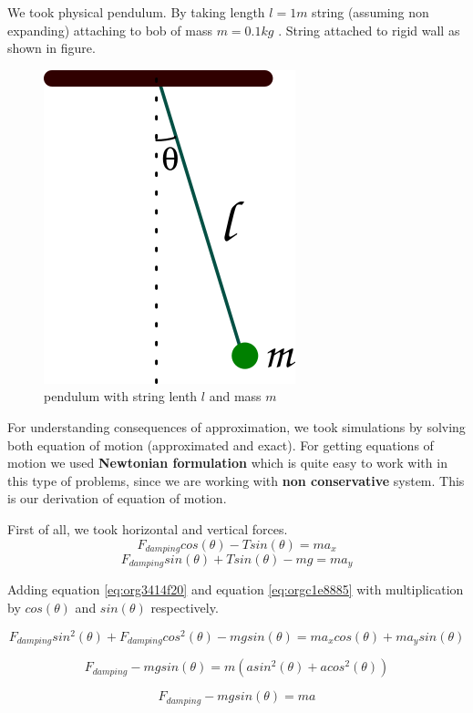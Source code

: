 \documentclass[11pt,a4paper]{article}
\begin{document}
We took physical pendulum. By taking length \(l = 1 m\) string (assuming non expanding) attaching to bob of mass \(m = 0.1 kg\) . String attached to rigid wall as shown in figure. 

\begin{figure}[htbp]
\centering
\includegraphics[width=0.3 \textwidth]{./figure1.png}
\caption{\label{fig:org800f4ce}pendulum with string lenth \(l\) and mass \(m\)}
\end{figure}

For understanding consequences of approximation, we took simulations by solving both equation of motion (approximated and exact). For getting equations of motion we used \textbf{Newtonian formulation} which is quite easy to work with in this type of problems, since we are working with \textbf{non conservative} system. This is our derivation of equation of motion.

First of all, we took horizontal and vertical forces.
\begin{equation}
\label{eq:org3414f20}
   F_{damping}cos(\theta)-Tsin(\theta)=ma_{x}
\end{equation}
\begin{equation}
\label{eq:orgc1e8885}
   F_{damping}sin(\theta)+Tsin(\theta)-mg=ma_{y}
\end{equation}

Adding equation \ref{eq:org3414f20} and equation \ref{eq:orgc1e8885} with multiplication by \(cos(\theta)\) and \(sin(\theta)\) respectively.

\begin{equation*}
\label{eq:orgcb04107}
F_{damping}sin^{2}(\theta)+F_{damping}cos^{2}(\theta)-mgsin(\theta)=ma_{x}cos(\theta)+ma_{y}sin(\theta)
\end{equation*}

\begin{equation*}
\label{eq:org80b5f60}
F_{damping}-mgsin(\theta)=m(asin^{2}(\theta)+acos^{2}(\theta))
\end{equation*}

\begin{equation}
\label{eq:org924218a}
F_{damping}-mgsin(\theta)=ma
\end{equation}
\end{document}
